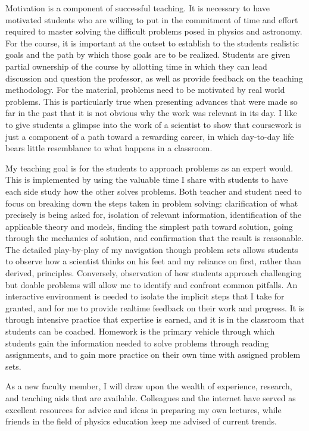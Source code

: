 \documentclass[12pt]{article}
\begin{document}
Motivation is a component of successful teaching.
It is necessary to have  motivated students who are willing to put in the commitment of time and effort
required to master solving the difficult problems posed in physics and astronomy.
For the course,
it is important at the outset to establish  to the students realistic goals and the path by which those goals are to be realized.
Students are given partial ownership of the course by allotting time in which they can lead discussion and question the
professor, as well as provide feedback on the teaching methodology.
For the material, problems need to be motivated by real world problems.
This is particularly true when presenting advances that were made so far in the past that it is not obvious
why the work was relevant in its day. 
I like to give students a glimpse into the work of a scientist to show that coursework
is just a component of a path toward a rewarding career, in which day-to-day life bears little resemblance to what
happens in a classroom.

My teaching goal is for the students to approach problems as an expert would.  This is implemented by using
the valuable time I share with students to have  each side study how the other
solves problems.  Both teacher and student need to focus on breaking down the steps taken in problem solving: 
clarification of what precisely is being asked for,
isolation of relevant information, 
identification of the applicable theory and models, finding the simplest path toward solution,
going through the mechanics of solution, and confirmation that the result is reasonable.
The detailed play-by-play of my navigation though problem sets  allows students to observe how a scientist thinks on his
feet and my reliance on first, rather than derived, principles.  Conversely, observation of how students
approach challenging but doable problems will allow me to identify and confront common pitfalls.
An interactive environment is needed to isolate the implicit  steps that I take for granted,
and for me to provide realtime feedback on their work and progress.
It is through intensive practice that expertise is earned, and it is in the classroom that students can be coached.
Homework is the primary vehicle through which students gain the information needed to solve problems
through reading assignments, and to gain more practice on their own time with assigned problem sets.

As a new faculty member, I will draw upon the wealth of experience, research, and teaching aids that are
available.
Colleagues and the internet have served as excellent resources for advice and ideas in preparing
my own lectures, while friends in the field of physics education keep me advised of current trends. 
 \iftoggle{UW}{The University of Washington Institute for Science & Mathematics Education}{I will avail
 myself to the resources for faculty at the Center
 for Research on Learning and Teaching.}
\end{document}
